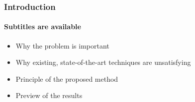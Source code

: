 
\begin{frame}
	\frametitle{Introduction}
	\framesubtitle{Subtitles are available}
\begin{itemize}
	\item Why the problem is important
	\item Why existing, state-of-the-art techniques are unsatisfying
	\item Principle of the proposed method
	\item Preview of the results
\end{itemize}
\end{frame}

